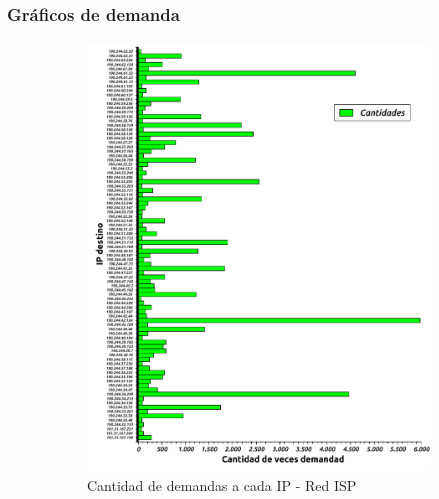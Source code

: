 \subsubsection{Gr\'aficos de demanda}  %

\begin{figure}[H]
        \begin{subfigure}[H]{0.5\textwidth}
                \centering
                \includegraphics[width=1\textwidth]{graficos/cantidadConsultasCasaJulian.pdf}
                \caption{Cantidad de demandas a cada IP - Red ISP}
                \label{fig:hist1}
        \end{subfigure}
        \begin{subfigure}[H]{0.5\textwidth}
                \centering

\end{subfigure}
\end{figure}

